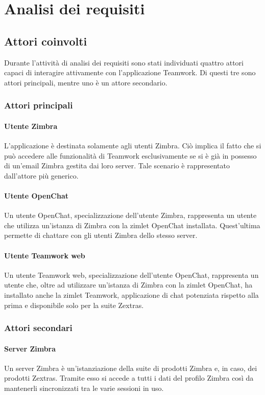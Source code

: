 
\chapter{Analisi dei requisiti}\label{chap:requirements}

\section{Attori coinvolti}
Durante l'attività di analisi dei requisiti sono stati individuati quattro 
attori capaci di  interagire attivamente con l'applicazione Teamwork. 
Di questi tre sono attori principali, mentre uno è un attore secondario.
\subsection{Attori principali}
\subsubsection{Utente Zimbra}
L'applicazione è destinata solamente agli utenti Zimbra. Ciò implica il fatto che si può accedere alle funzionalità di Teamwork esclusivamente se si è già in 
possesso di un'email Zimbra gestita dai loro server. Tale scenario è
rappresentato dall'attore più generico.
\subsubsection{Utente OpenChat}
Un utente OpenChat, specializzazione dell'utente Zimbra, rappresenta un utente che utilizza un'istanza di Zimbra con la zimlet OpenChat installata. Quest'ultima permette di chattare con gli utenti Zimbra dello stesso server.

\subsubsection{Utente Teamwork web}
Un utente Teamwork web, specializzazione dell'utente OpenChat, rappresenta 
un utente che, oltre ad utilizzare un'istanza di Zimbra con la zimlet OpenChat, 
ha installato anche la zimlet Teamwork, applicazione di chat potenziata rispetto 
alla prima e disponibile solo per la suite Zextras.

\subsection{Attori secondari}
\subsubsection{Server Zimbra}
Un server Zimbra è un'istanziazione della suite di prodotti Zimbra e, in caso, 
dei prodotti Zextras. Tramite esso si accede a tutti i dati del profilo Zimbra 
così da mantenerli sincronizzati tra le varie sessioni in uso.

